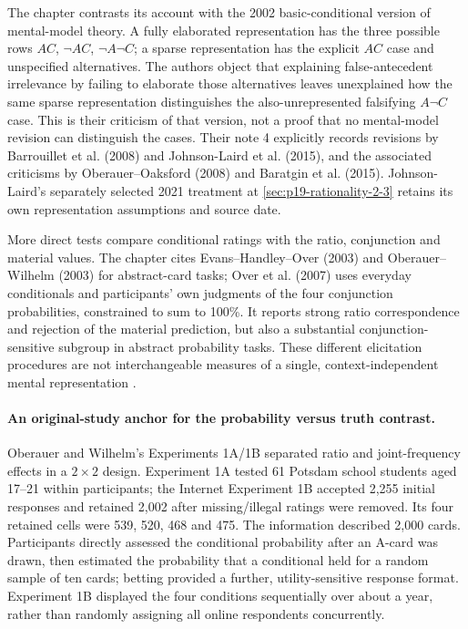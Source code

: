 The chapter contrasts its account with the 2002 basic-conditional version
of mental-model theory. A fully elaborated representation has the three
possible rows \(A C\), \(\neg A C\), \(\neg A\neg C\); a sparse
representation has the explicit \(A C\) case and unspecified alternatives.
The authors object that explaining false-antecedent irrelevance by failing
to elaborate those alternatives leaves unexplained how the same sparse
representation distinguishes the also-unrepresented falsifying
\(A\neg C\) case. This is their criticism of that version, not a
proof that no mental-model revision can distinguish the cases.
Their note 4 explicitly records revisions by Barrouillet et al. (2008)
and Johnson-Laird et al. (2015), and the associated criticisms by
Oberauer--Oaksford (2008) and Baratgin et al. (2015).
Johnson-Laird's separately selected 2021 treatment at
\cref{sec:p19-rationality-2-3} retains its own representation assumptions
and source date.

More direct tests compare conditional ratings with the ratio, conjunction
and material values. The chapter cites Evans--Handley--Over (2003)
and Oberauer--Wilhelm (2003) for abstract-card tasks; Over et al. (2007)
uses everyday conditionals and participants' own judgments of the four
conjunction probabilities, constrained to sum to 100\%. It reports strong
ratio correspondence and rejection of the material prediction, but also
a substantial conjunction-sensitive subgroup in abstract probability tasks.
These different elicitation procedures are not interchangeable measures
of a single, context-independent mental representation
\cite[pp.~298--299]{OberauerPessach2021ProbabilitiesConditionals}.

\paragraph{An original-study anchor for the probability versus truth contrast.}
Oberauer and Wilhelm's Experiments 1A/1B separated ratio and joint-frequency
effects in a \(2\times2\) design. Experiment 1A tested 61 Potsdam
school students aged 17--21 within participants; the Internet Experiment
1B accepted 2,255 initial responses and retained 2,002 after missing/illegal
ratings were removed. Its four retained cells were 539, 520, 468 and 475.
The information described 2,000 cards. Participants directly assessed
the conditional probability after an A-card was drawn, then estimated
the probability that a conditional held for a random sample of ten cards;
betting provided a further, utility-sensitive response format. Experiment
1B displayed the four conditions sequentially over about a year, rather
than randomly assigning all online respondents concurrently.

